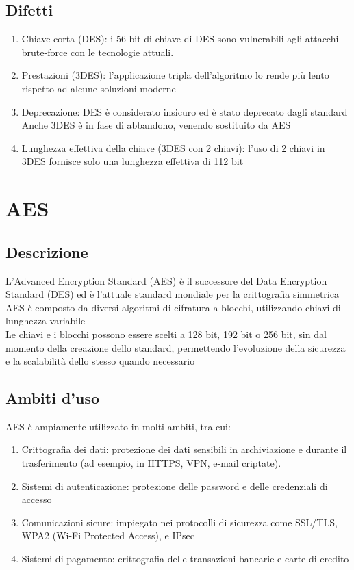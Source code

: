 \documentclass[10pt,oneside,a4paper]{article}
\begin{document}
\subsection{Difetti}
\begin{enumerate}
\item Chiave corta (DES): i 56 bit di chiave di DES sono vulnerabili agli attacchi brute-force con le tecnologie attuali.
\item Prestazioni (3DES): l'applicazione tripla dell'algoritmo lo rende più lento rispetto ad alcune soluzioni moderne
\item Deprecazione: DES è considerato insicuro ed è stato deprecato dagli standard
Anche 3DES è in fase di abbandono, venendo sostituito da AES
\item Lunghezza effettiva della chiave (3DES con 2 chiavi): l'uso di 2 chiavi in 3DES fornisce solo una lunghezza effettiva di 112 bit
\end{enumerate}
\section{AES}
\subsection{Descrizione}
L'Advanced Encryption Standard (AES) è il successore del Data Encryption Standard (DES) ed è l'attuale standard mondiale per la crittografia simmetrica\\
AES è composto da diversi algoritmi di cifratura a blocchi, utilizzando chiavi di lunghezza variabile\\
Le chiavi e i blocchi possono essere scelti a 128 bit, 192 bit o 256 bit, sin dal momento della creazione dello standard, permettendo l'evoluzione della sicurezza e la scalabilità dello stesso quando necessario
\subsection{Ambiti d'uso}
AES è ampiamente utilizzato in molti ambiti, tra cui:
\begin{enumerate}
\item Crittografia dei dati: protezione dei dati sensibili in archiviazione e durante il trasferimento (ad esempio, in HTTPS, VPN, e-mail criptate).
\item Sistemi di autenticazione: protezione delle password e delle credenziali di accesso
\item Comunicazioni sicure: impiegato nei protocolli di sicurezza come SSL/TLS, WPA2 (Wi-Fi Protected Access), e IPsec
\item Sistemi di pagamento: crittografia delle transazioni bancarie e carte di credito
\end{enumerate}
\end{document}
